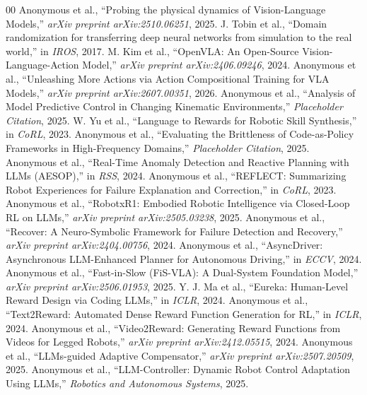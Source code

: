 \begin{thebibliography}{00}
 Anonymous et al., ``Probing the physical dynamics of Vision-Language Models,'' \textit{arXiv preprint arXiv:2510.06251}, 2025.
 J. Tobin et al., ``Domain randomization for transferring deep neural networks from simulation to the real world,'' in \textit{IROS}, 2017.
 M. Kim et al., ``OpenVLA: An Open-Source Vision-Language-Action Model,'' \textit{arXiv preprint arXiv:2406.09246}, 2024.
 Anonymous et al., ``Unleashing More Actions via Action Compositional Training for VLA Models,'' \textit{arXiv preprint arXiv:2607.00351}, 2026.
 Anonymous et al., ``Analysis of Model Predictive Control in Changing Kinematic Environments,'' \textit{Placeholder Citation}, 2025.
 W. Yu et al., ``Language to Rewards for Robotic Skill Synthesis,'' in \textit{CoRL}, 2023.
 Anonymous et al., ``Evaluating the Brittleness of Code-as-Policy Frameworks in High-Frequency Domains,'' \textit{Placeholder Citation}, 2025.
 Anonymous et al., ``Real-Time Anomaly Detection and Reactive Planning with LLMs (AESOP),'' in \textit{RSS}, 2024.
 Anonymous et al., ``REFLECT: Summarizing Robot Experiences for Failure Explanation and Correction,'' in \textit{CoRL}, 2023.
 Anonymous et al., ``RobotxR1: Embodied Robotic Intelligence via Closed-Loop RL on LLMs,'' \textit{arXiv preprint arXiv:2505.03238}, 2025.
 Anonymous et al., ``Recover: A Neuro-Symbolic Framework for Failure Detection and Recovery,'' \textit{arXiv preprint arXiv:2404.00756}, 2024.
 Anonymous et al., ``AsyncDriver: Asynchronous LLM-Enhanced Planner for Autonomous Driving,'' in \textit{ECCV}, 2024.
 Anonymous et al., ``Fast-in-Slow (FiS-VLA): A Dual-System Foundation Model,'' \textit{arXiv preprint arXiv:2506.01953}, 2025.
 Y. J. Ma et al., ``Eureka: Human-Level Reward Design via Coding LLMs,'' in \textit{ICLR}, 2024.
 Anonymous et al., ``Text2Reward: Automated Dense Reward Function Generation for RL,'' in \textit{ICLR}, 2024.
 Anonymous et al., ``Video2Reward: Generating Reward Functions from Videos for Legged Robots,'' \textit{arXiv preprint arXiv:2412.05515}, 2024.
 Anonymous et al., ``LLMs-guided Adaptive Compensator,'' \textit{arXiv preprint arXiv:2507.20509}, 2025.
 Anonymous et al., ``LLM-Controller: Dynamic Robot Control Adaptation Using LLMs,'' \textit{Robotics and Autonomous Systems}, 2025.

\end{thebibliography}
